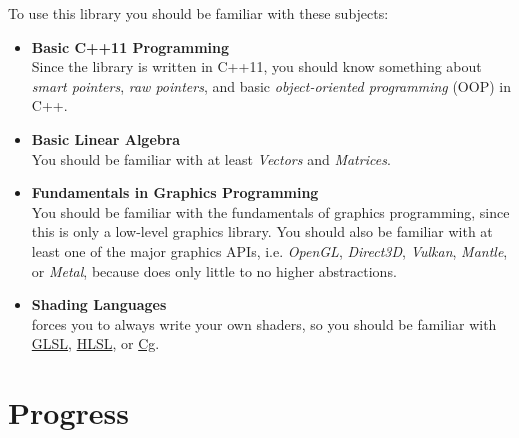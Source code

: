 \documentclass{article}
\begin{document}
To use this library you should be familiar with these subjects:
\begin{itemize}
	\item \textbf{Basic C++11 Programming} \\
	Since the library is written in C++11, you should know something about \emph{smart pointers},
	\emph{raw pointers}, and basic \emph{object-oriented programming} (OOP) in C++.
	
	\item \textbf{Basic Linear Algebra} \\
	You should be familiar with at least \emph{Vectors} and \emph{Matrices}.
	
	\item \textbf{Fundamentals in Graphics Programming} \\
	You should be familiar with the fundamentals of graphics programming, since this is only a low-level graphics library.
	You should also be familiar with at least one of the major graphics APIs,
	i.e. \emph{OpenGL}, \emph{Direct3D}, \emph{Vulkan}, \emph{Mantle}, or \emph{Metal},
	because \LLGL does only little to no higher abstractions.
	
	\item \textbf{Shading Languages} \\
	\LLGL forces you to always write your own shaders, so you should be familiar with
	\href{https://www.opengl.org/documentation/glsl/}{GLSL},
	\href{https://msdn.microsoft.com/de-de/library/windows/desktop/bb509561(v=vs.85).aspx}{HLSL},
	or \href{https://developer.nvidia.com/cg-toolkit}{Cg}.
\end{itemize}



\section*{Progress}
\end{document}
